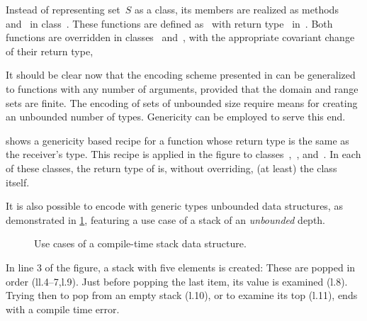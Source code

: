 \documentclass[a4paper,USenglish]{lipics-v2016}
\begin{document}
Instead of representing set~$S$ as a class,
  its members are realized as methods~ and~ in class~.
These functions are defined as~ with return type~
  in~.
Both functions are overridden in classes~ and~,
   with the appropriate covariant change of their return type,

It should be clear now that the encoding scheme presented
in  can be generalized to functions
  with any number of arguments, provided that the domain and range sets are finite.
The encoding of sets of unbounded size require means for creating an unbounded
 number of types.
Genericity can be employed to serve this end.


 shows a genericity based recipe for
  a function whose return type
  is the same as the receiver's type.
  This recipe is applied in the figure to classes~,~, and~.
  In each of these classes, the return type of  is,
  without overriding, (at least) the class itself.

It is also possible to encode with \Java generic types
  unbounded data structures, 
  as demonstrated in \cref{Figure:stack-use-cases},
  featuring a use case of a stack of an \emph{unbounded} depth.
\vspace{2ex}

\begin{figure}[ht]
  \caption{\label{Figure:stack-use-cases}    Use cases of a compile-time stack data structure.
  }
\end{figure}

In line 3 of the figure, a stack with five elements is created:
These are popped in order (ll.4--7,l.9).
Just before popping the last item, its value is examined (l.8).
Trying then to pop from an empty stack (l.10), or to examine its top (l.11), ends with
  a compile time error.
\end{document}
